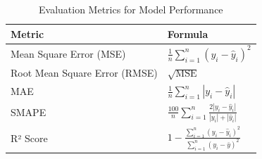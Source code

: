 \begin{table}[h!]
\centering
\caption{Evaluation Metrics for Model Performance}
\label{table:error_metrics}
\begin{tabularx}{\linewidth}{lX}
\toprule
\textbf{Metric} & \textbf{Formula} \\
\midrule
Mean Square Error (MSE) & $\frac{1}{n}\sum_{i=1}^{n}(y_i - \hat{y}_i)^2$ \\[0.3em]
Root Mean Square Error (RMSE) & $\sqrt{\text{MSE}}$ \\[0.3em]
MAE & $\frac{1}{n}\sum_{i=1}^{n}|y_i - \hat{y}_i|$ \\[0.3em]
SMAPE & $\frac{100}{n}\sum_{i=1}^{n}\frac{2|y_i - \hat{y}_i|}{|y_i| + |\hat{y}_i|}$ \\[0.3em]
R² Score & $1 - \frac{\sum_{i=1}^{n}(y_i - \hat{y}_i)^2}{\sum_{i=1}^{n}(y_i - \bar{y})^2}$ \\
\bottomrule
\end{tabularx}
\end{table}